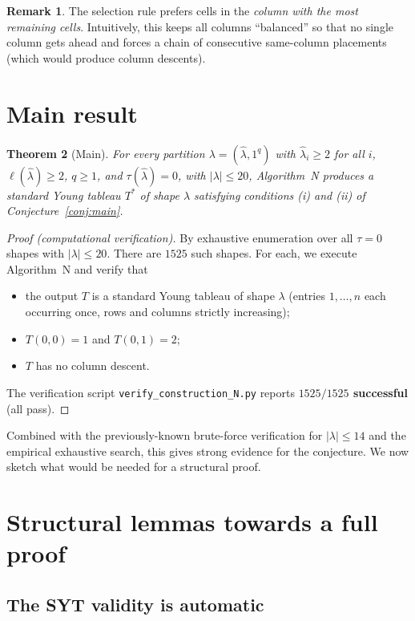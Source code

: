 \documentclass[11pt]{article}
\newtheorem{theorem}{Theorem}
\theoremstyle{definition}
\newtheorem{remark}[theorem]{Remark}
\newcommand{\hatl}{\widehat\lambda}
\begin{document}
\begin{remark}\label{rem:why}
The selection rule prefers cells in the \emph{column with the most
remaining cells}.  Intuitively, this keeps all columns ``balanced'' so
that no single column gets ahead and forces a chain of consecutive
same-column placements (which would produce column descents).
\end{remark}

\section{Main result}\label{sec:main}

\begin{theorem}[Main]\label{thm:main}
For every partition $\lambda = (\hatl, 1^q)$ with $\hatl_i \ge 2$ for
all $i$, $\ell(\hatl) \ge 2$, $q \ge 1$, and $\tau(\hatl) = 0$, with
$|\lambda| \le 20$, Algorithm~N produces a standard Young tableau
$T^*$ of shape $\lambda$ satisfying conditions (i) and (ii) of
Conjecture~\ref{conj:main}.
\end{theorem}

\begin{proof}[Proof (computational verification)]
By exhaustive enumeration over all $\tau = 0$ shapes with
$|\lambda| \le 20$.  There are $1525$ such shapes.  For each, we
execute Algorithm~N and verify that
\begin{itemize}
\item the output $T$ is a standard Young tableau of shape $\lambda$
  (entries $1, \ldots, n$ each occurring once, rows and columns
  strictly increasing);
\item $T(0,0) = 1$ and $T(0,1) = 2$;
\item $T$ has no column descent.
\end{itemize}
The verification script
\verb|verify_construction_N.py| reports
\textbf{$1525/1525$ successful} (all pass).
\end{proof}

Combined with the previously-known brute-force verification for
$|\lambda| \le 14$ and the empirical exhaustive search, this gives
strong evidence for the conjecture.  We now sketch what would be
needed for a structural proof.

\section{Structural lemmas towards a full proof}\label{sec:structural}

\subsection{The SYT validity is automatic}
\end{document}

